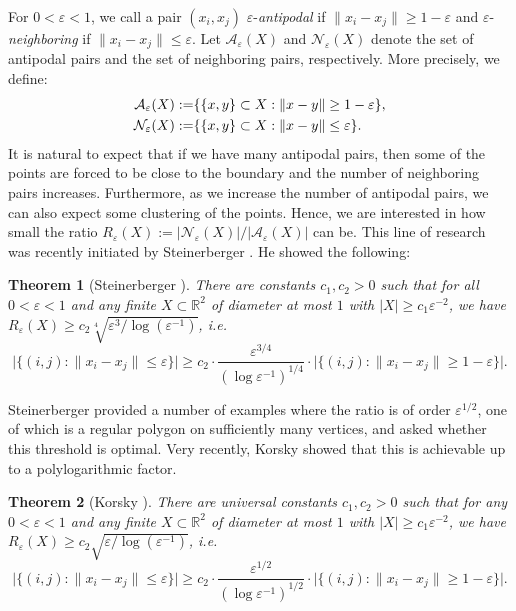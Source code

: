 \documentclass[12pt]{article}
\newtheorem{thm}{Theorem}[section]
\newcommand{\eps}{\varepsilon}
\begin{document}
 For $0<\eps<1$, we call a pair $(x_i,x_j)$ $\varepsilon$-\emph{antipodal} if $\|x_i-x_j\|\ge 1-\eps$ and $\varepsilon$-\emph{neighboring} if $\|x_i-x_j\|\le \eps$.  Let $\mathcal{A}_\eps(X)$ and $\mathcal{N}_\eps(X)$ denote the set of antipodal pairs and the set of neighboring pairs, respectively. More precisely, we define:
\begin{align*}
     \mathcal{A}_\eps(X):=&\{\{x,y\}\subset X: \|x-y\|\geq 1-\eps\}, \\
     \vspace{4pt}\mathcal{N}_\eps(X):=&\{\{x,y\}\subset X: \|x-y\|\leq \eps\}. 
\end{align*}   
  It is natural to expect that if we have many antipodal pairs, then some of the points are forced to be close to the boundary and the number of neighboring pairs increases. Furthermore, as we increase the number of antipodal pairs, we can also expect some clustering of the points. Hence, we are interested in how small the ratio $R_\eps(X):=|\mathcal{N}_\eps(X)|/|\mathcal{A}_\eps(X)|$  can be. This line of research was recently initiated by Steinerberger \cite{steinerberger2025antipodesimpliesneighbors}. He showed the following: %

\begin{thm}[Steinerberger \cite{steinerberger2025antipodesimpliesneighbors}]\label{thm:steinerberger}
There are constants $c_1,c_2>0$ such that for all $0<\varepsilon <1$ and any finite $X\subset \mathbb{R}^2$ of diameter at most $1$ with $|X|\ge c_1\varepsilon^{-2}$, we have $R_\eps(X)\ge c_2\sqrt[4]{\eps^3/\log(\eps^{-1})}$, i.e.
    \[
\big|\{(i,j):\|x_i-x_j\|\le \eps\}\big|
\ge c_2\cdot \frac{\eps^{3/4}}{(\log\eps^{-1})^{1/4}}\cdot
\big|\{(i,j):\|x_i-x_j\|\ge 1-\eps\}\big|.
\]

\end{thm}

Steinerberger provided a number of examples where the ratio is of order $\eps^{1/2}$, one of which is a regular polygon on sufficiently many vertices, and asked whether this threshold is optimal. Very recently, Korsky \cite{korsky2026optimalspectralboundsantipodal} showed that this is achievable up to a polylogarithmic factor. 

\begin{thm}[Korsky \cite{korsky2026optimalspectralboundsantipodal}]\label{thm:korsky}
There are universal constants $c_1,c_2>0$ such that for any $0<\varepsilon<1$  and  any finite $X\subset \mathbb{R}^2$ of diameter at most $1$ with $|X|\ge c_1\varepsilon^{-2}$, we have ${R_\eps(X)\ge c_2\sqrt{\eps/\log(\eps^{-1})}}$, i.e.
    \[
\big|\{(i,j):\|x_i-x_j\|\le \eps\}\big|
\ge c_2\cdot \frac{\eps^{1/2}}{(\log\eps^{-1})^{1/2}}\cdot
\big|\{(i,j):\|x_i-x_j\|\ge 1-\eps\}\big|.
\]

\end{thm}
\end{document}
